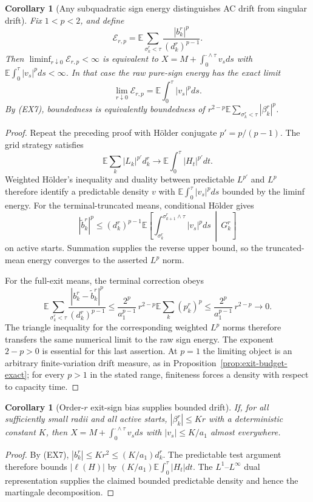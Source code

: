 \documentclass[11pt]{article}
\newtheorem{corollary}[theorem]{Corollary}
\theoremstyle{definition}\newtheorem{definition}[theorem]{Definition}
\theoremstyle{remark}\newtheorem{remark}[theorem]{Remark}
\begin{document}
\begin{corollary}[Any subquadratic sign energy distinguishes AC drift from singular drift]
\label{cor:exit-subquadratic-energy}
Fix $1<p<2$, and define
\[
 \mathcal E_{r,p}=\mathbb E\sum_{\sigma^r_k<\tau}
                  \frac{|b^r_k|^p}{(d^r_k)^{p-1}}.
 \tag{EX12}
\]
Then $\liminf_{r\downarrow0}\mathcal E_{r,p}<\infty$ is equivalent to
$X=M+\int_0^{\cdot\wedge\tau}v_sds$ with
$\mathbb E\int_0^\tau|v_s|^pds<\infty$. In that case the \emph{raw}
pure-sign energy has the exact limit
\[
 \lim_{r\downarrow0}\mathcal E_{r,p}
       =\mathbb E\int_0^\tau|v_s|^pds.
 \tag{EX13}
\]
By (EX7), boundedness is equivalently boundedness of
$r^{2-p}\mathbb E\sum_{\sigma^r_k<\tau}|\beta^r_k|^p$.
\end{corollary}
\begin{proof}
Repeat the preceding proof with H\"older conjugate $p'=p/(p-1)$.
The grid strategy satisfies
\[
 \mathbb E\sum_k|L_k|^{p'}d^r_k
       \longrightarrow\mathbb E\int_0^\tau|H_t|^{p'}dt.
\]
Weighted H\"older's inequality and duality between predictable
$L^{p'}$ and $L^p$ therefore identify a predictable density $v$ with
$\mathbb E\int_0^\tau|v_s|^pds$ bounded by the liminf energy.
For the terminal-truncated means, conditional H\"older gives
\[
 |\widetilde b^r_k|^p\le(d^r_k)^{p-1}
  \mathbb E\left[\int_{\sigma^r_k}^{\sigma^r_{k+1}\wedge\tau}
                 |v_s|^pds\,\middle|\,G^r_k\right]
\]
on active starts. Summation supplies the reverse upper bound, so the
truncated-mean energy converges to the asserted $L^p$ norm.

For the full-exit means, the terminal correction obeys
\[
 \mathbb E\sum_{\sigma^r_k<\tau}
  \frac{|b^r_k-\widetilde b^r_k|^p}{(d^r_k)^{p-1}}
 \le \frac{2^p}{a_1^{p-1}}\,r^{2-p}
             \mathbb E\sum_k(p^r_k)^p
 \le \frac{2^p}{a_1^{p-1}}\,r^{2-p}\longrightarrow0.
 \tag{EX14}
\]
The triangle inequality for the corresponding weighted $L^p$ norms
therefore transfers the same numerical limit to the raw sign energy.
The exponent $2-p>0$ is essential for this last assertion. At $p=1$
the limiting object is an arbitrary finite-variation drift measure,
as in Proposition~\ref{prop:exit-budget-exact}; for every $p>1$ in the
stated range, finiteness forces a density with respect to capacity time.
\end{proof}

\begin{corollary}[Order-$r$ exit-sign bias supplies bounded drift]
\label{cor:exit-bias-bounded-drift}
If, for all sufficiently small radii and all active starts,
$|\beta^r_k|\le Kr$ with a deterministic constant $K$, then
$X=M+\int_0^{\cdot\wedge\tau}v_sds$ with
$|v_s|\le K/a_1$ almost everywhere.
\end{corollary}
\begin{proof}
By (EX7), $|b^r_k|\le Kr^2\le(K/a_1)d^r_k$.
The predictable test argument therefore bounds
$|\ell(H)|$ by $(K/a_1)\mathbb E\int_0^\tau|H_t|dt$.
The $L^1$--$L^\infty$ dual representation supplies the claimed bounded
predictable density and hence the martingale decomposition.
\end{proof}
\end{document}
